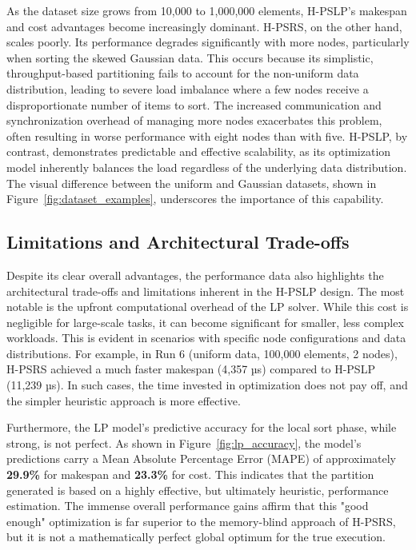 \documentclass{article}
\begin{document}
As the dataset size grows from 10,000 to 1,000,000 elements, H-PSLP's makespan and cost advantages become increasingly dominant. H-PSRS, on the other hand, scales poorly. Its performance degrades significantly with more nodes, particularly when sorting the skewed Gaussian data. This occurs because its simplistic, throughput-based partitioning fails to account for the non-uniform data distribution, leading to severe load imbalance where a few nodes receive a disproportionate number of items to sort. The increased communication and synchronization overhead of managing more nodes exacerbates this problem, often resulting in worse performance with eight nodes than with five. H-PSLP, by contrast, demonstrates predictable and effective scalability, as its optimization model inherently balances the load regardless of the underlying data distribution. The visual difference between the uniform and Gaussian datasets, shown in Figure~\ref{fig:dataset_examples}, underscores the importance of this capability.

\subsection{Limitations and Architectural Trade-offs}

Despite its clear overall advantages, the performance data also highlights the architectural trade-offs and limitations inherent in the H-PSLP design. The most notable is the upfront computational overhead of the LP solver. While this cost is negligible for large-scale tasks, it can become significant for smaller, less complex workloads. This is evident in scenarios with specific node configurations and data distributions. For example, in Run 6 (uniform data, 100,000 elements, 2 nodes), H-PSRS achieved a much faster makespan (4,357 µs) compared to H-PSLP (11,239 µs). In such cases, the time invested in optimization does not pay off, and the simpler heuristic approach is more effective.

Furthermore, the LP model's predictive accuracy for the local sort phase, while strong, is not perfect. As shown in Figure~\ref{fig:lp_accuracy}, the model's predictions carry a Mean Absolute Percentage Error (MAPE) of approximately \textbf{29.9\%} for makespan and \textbf{23.3\%} for cost. This indicates that the partition generated is based on a highly effective, but ultimately heuristic, performance estimation. The immense overall performance gains affirm that this "good enough" optimization is far superior to the memory-blind approach of H-PSRS, but it is not a mathematically perfect global optimum for the true execution.
\end{document}
